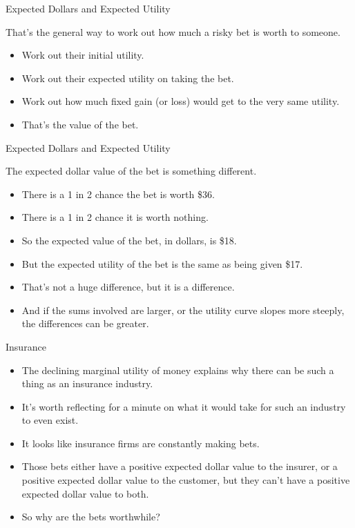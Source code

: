 \documentclass[
  ignorenonframetext,
]{beamer}
\providecommand{\tightlist}{%
  \setlength{\itemsep}{0pt}\setlength{\parskip}{0pt}}
\renewcommand{\,}{\text{, }}
\begin{document}
\begin{frame}{Expected Dollars and Expected Utility}
\protect\hypertarget{expected-dollars-and-expected-utility-2}{}

That's the general way to work out how much a risky bet is worth to
someone.

\begin{itemize}
\tightlist
\item
  Work out their initial utility.
\item
  Work out their expected utility on taking the bet.
\item
  Work out how much fixed gain (or loss) would get to the very same
  utility.
\item
  That's the value of the bet.
\end{itemize}

\end{frame}

\begin{frame}{Expected Dollars and Expected Utility}
\protect\hypertarget{expected-dollars-and-expected-utility-3}{}

The expected dollar value of the bet is something different.

\begin{itemize}
\tightlist
\item
  There is a 1 in 2 chance the bet is worth \$36.
\item
  There is a 1 in 2 chance it is worth nothing.
\item
  So the expected value of the bet, in dollars, is \$18.
\item
  But the expected utility of the bet is the same as being given \$17.
\item
  That's not a huge difference, but it is a difference.
\item
  And if the sums involved are larger, or the utility curve slopes more
  steeply, the differences can be greater.
\end{itemize}

\end{frame}

\begin{frame}{Insurance}
\protect\hypertarget{insurance}{}

\begin{itemize}
\tightlist
\item
  The declining marginal utility of money explains why there can be such
  a thing as an insurance industry.
\item
  It's worth reflecting for a minute on what it would take for such an
  industry to even exist.
\item
  It looks like insurance firms are constantly making bets.
\item
  Those bets either have a positive expected dollar value to the
  insurer, or a positive expected dollar value to the customer, but they
  can't have a positive expected dollar value to both.
\item
  So why are the bets worthwhile?
\end{itemize}

\end{frame}
\end{document}
